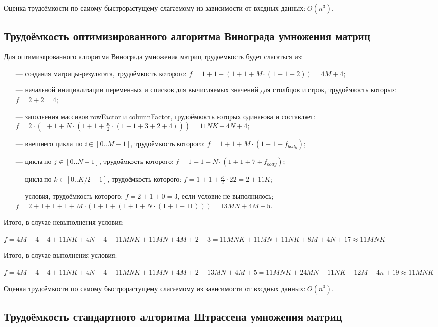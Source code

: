 Оценка трудоёмкости по самому быстрорастущему слагаемому из зависимости от входных данных: $O(n^3)$.

\subsection{Трудоёмкость оптимизированного алгоритма Винограда умножения матриц}

Для оптимизированного алгоритма Винограда умножения матриц трудоемкость будет слагаться из:

\begin{itemize}
	\item[---] создания матрицы-результата, трудоёмкость которого: $f = 1 + 1 + (1 + 1 + M \cdot (1 + 1 + 2)) = 4M+4$;
	\item[---] начальной инициализации переменных и списков для вычисляемых значений для столбцов и строк, трудоёмкость которых: $f = 2 + 2 = 4$;
	\item[---] заполнения массивов rowFactor и columnFactor, трудоёмкость которых одинакова и составляет: $f = 2 \cdot (1 + 1 + N \cdot (1 + 1 + \frac{K}{2} \cdot (1 + 1 + 3 + 2 + 4))) = 11NK + 4N + 4$; 
	\item[---] внешнего цикла по $i \in [0..M-1]$, трудоёмкость которого: $f = 1 + 1 + M \cdot (1 + 1 + f_{body})$;
	\item[---] цикла по $j \in [0..N-1]$, трудоёмкость которого: $f = 1 + 1 + N \cdot (1 + 1 + 7 + f_{body})$;
	\item[---] цикла по $k \in [0..K/2-1]$, трудоёмкость которого: $f = 1 + 1 + \frac{K}{2} \cdot 22 = 2 + 11K$;
	\item[---] условия, трудоёмкость которого: $f = 2 + 1 + 0 = 3$, если условие не выполнилось; $f = 2 + 1 + 1 + 1 + M \cdot (1 + 1 + (1 + 1 + N \cdot (1 + 1 + 11))) = 13MN+4M+5$.
\end{itemize}

Итого, в случае невыполнения условия:

$f = 4M+4+4+11NK+4N+4+11MNK+11MN+4M+2+3 = 11MNK+11MN+11NK+8M+4N+17 \approx 11MNK$

Итого, в случае выполнения условия:

$f = 4M+4+4+11NK+4N+4+11MNK+11MN+4M+2 + 13MN+4M+5 = 11MNK+24MN+11NK+12M+4n+19 \approx 11MNK$

Оценка трудоёмкости по самому быстрорастущему слагаемому из зависимости от входных данных: $O(n^3)$.

\subsection{Трудоёмкость стандартного алгоритма Штрассена умножения матриц}

